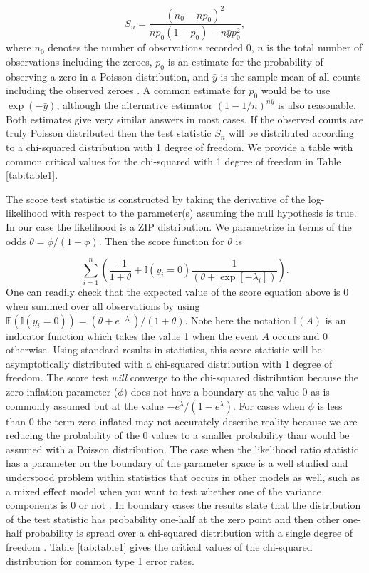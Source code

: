 \documentclass{article}
\begin{document}
\begin{equation}
S_n = \frac{(n_0 - np_0)^2}{np_0(1-p_0) - n\bar{y}p_0^2},
\end{equation}
where $n_0$ denotes the number of observations recorded 0, $n$ is the total number of observations including the zeroes, $p_0$ is an estimate for the probability of observing a zero in a Poisson distribution, and $\bar{y}$ is the sample mean of all counts including the observed zeroes \cite{van1995score}. A common estimate for $p_0$ would be to use $\exp(-\bar{y})$, although the alternative estimator $(1-1/n)^{n\bar{y}}$ is also reasonable. Both estimates give very similar answers in most cases. If the observed counts are truly Poisson distributed then the test statistic $S_n$ will be distributed according to a chi-squared distribution with 1 degree of freedom. We provide a table with common critical values for the chi-squared with 1 degree of freedom in Table \ref{tab:table1}. 

The score test statistic is constructed by taking the derivative of the log-likelihood with respect to the parameter(s) assuming the null hypothesis is true. In our case the likelihood is a ZIP distribution. We parametrize in terms of the odds $\theta = \phi /(1-\phi)$. Then the score function for $\theta$ is

\begin{equation}
\sum_{i=1}^n \left( \frac{-1}{1+\theta}+ \mathbb{I}(y_i=0)\frac{1}{(\theta+\exp[-\lambda_i])}\right).
\end{equation}
One can readily check that the expected value of the score equation above is 0 when summed over all observations by using $\mathbb{E}(\mathbb{I}(y_i=0))=(\theta+e^{-\lambda_i})/(1+\theta)$. Note here the notation $\mathbb{I}(A)$ is an indicator function which takes the value 1 when the event $A$ occurs and 0 otherwise. Using standard results in statistics, this score statistic will be asymptotically distributed with a chi-squared distribution with 1 degree of freedom. The score test \emph{will} converge to the chi-squared distribution because the zero-inflation parameter ($\phi$) does not have a boundary at the value 0 as is commonly assumed but at the value $-e^\lambda/(1-e^\lambda)$. For cases when $\phi$ is less than 0 the term zero-inflated may not accurately describe reality because we are reducing the probability of the 0 values to a smaller probability than would be assumed with a Poisson distribution. The case when the likelihood ratio statistic has a parameter on the boundary of the parameter space is a well studied and understood problem within statistics that occurs in other models as well, such as a mixed effect model when you want to test whether one of the variance components is 0 or not \cite{crainiceanu2004likelihood}. In boundary cases the results state that the distribution of the test statistic has probability one-half at the zero point and then other one-half probability is spread over a chi-squared distribution with a single degree of freedom \cite{chernoff1954distribution,feng1992statistical,self1987asymptotic}. Table \ref{tab:table1} gives the critical values of the chi-squared distribution for common type 1 error rates. 
\end{document}
